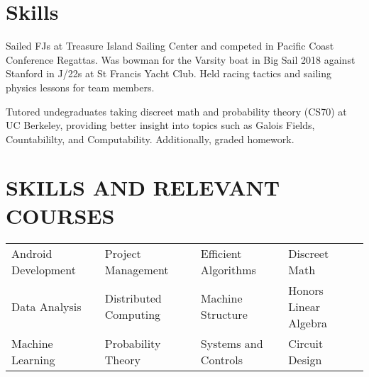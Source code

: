 \documentclass[10pt]{article}
\begin{document}
\section*{Skills}
                {Sailed FJs at Treasure Island Sailing Center and competed in Pacific Coast Conference Regattas. Was bowman for the Varsity boat in Big Sail 2018 against Stanford in J/22s at St Francis Yacht Club. Held racing tactics and sailing physics lessons for team members.}

				{Tutored undegraduates taking discreet math and probability theory (CS70) at UC Berkeley, providing 	better insight into topics such as Galois Fields, Countabililty, and Computability. Additionally, graded homework.}

                


\section*{SKILLS AND RELEVANT COURSES}
				\setlength{\columnsep}{.5pt}
				\begin{tabu}{X[2c]X[2.1c]X[2c]X[2c]}
					Android Development  & Project Management & Efficient Algorithms & Discreet Math \\
					Data Analysis 			   & Distributed Computing & Machine Structure & Honors Linear Algebra \\
					Machine Learning		   & Probability Theory & Systems and Controls & Circuit Design \\
				\end{tabu}
 
\end{document}
